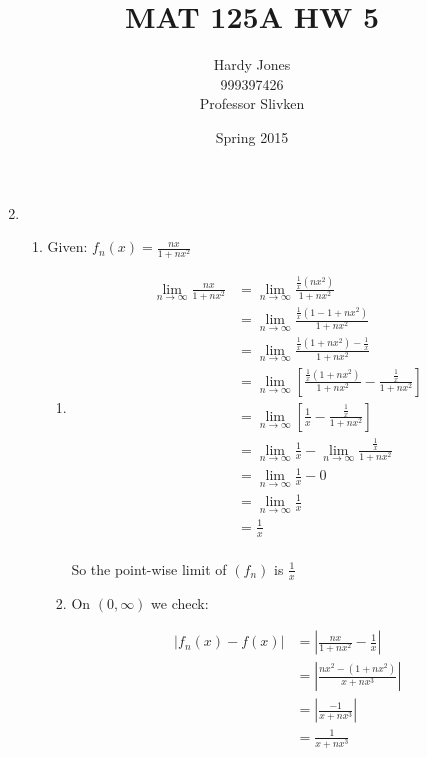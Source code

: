 \documentclass[12pt,letterpaper]{article}
\title{MAT 125A HW 5\vspace{-2ex}}
\author{Hardy Jones\\
        999397426\\
        Professor Slivken\vspace{-2ex}}
\date{Spring 2015}
\begin{document}
  \maketitle

  \begin{enumerate}
    \setcounter{enumi}{1}
    \item
      \begin{enumerate}
        \item
          Given: $f_n(x) = \frac{nx}{1 + nx^2}$
          \begin{enumerate}
            \item
              \begin{align*}
                \lim_{n \to \infty}\frac{nx}{1 + nx^2}
                &= \lim_{n \to \infty}\frac{\frac{1}{x}\left(nx^2\right)}{1 + nx^2} \\
                &= \lim_{n \to \infty}\frac{\frac{1}{x}\left(1 - 1 + nx^2\right)}{1 + nx^2} \\
                &= \lim_{n \to \infty}\frac{\frac{1}{x}\left(1 + nx^2\right) - \frac{1}{x}}{1 + nx^2} \\
                &= \lim_{n \to \infty}\left[\frac{\frac{1}{x}\left(1 + nx^2\right)}{1 + nx^2} - \frac{\frac{1}{x}}{1 + nx^2}\right] \\
                &= \lim_{n \to \infty}\left[\frac{1}{x} - \frac{\frac{1}{x}}{1 + nx^2}\right] \\
                &= \lim_{n \to \infty}\frac{1}{x} - \lim_{n \to \infty}\frac{\frac{1}{x}}{1 + nx^2} \\
                &= \lim_{n \to \infty}\frac{1}{x} - 0 \\
                &= \lim_{n \to \infty}\frac{1}{x} \\
                &= \frac{1}{x} \\
              \end{align*}

              So the point-wise limit of $(f_n)$ is $\frac{1}{x}$
            \item
              On $\left(0, \infty\right)$ we check:

              \begin{align*}
                \left|f_n(x) - f(x)\right|
                &= \left|\frac{nx}{1 + nx^2} - \frac{1}{x}\right| \\
                &= \left|\frac{nx^2 - (1 + nx^2)}{x + nx^3}\right| \\
                &= \left|\frac{-1}{x + nx^3}\right| \\
                &= \frac{1}{x + nx^3} \\
              \end{align*}


\end{enumerate}
\end{enumerate}
\end{enumerate}
\end{document}
